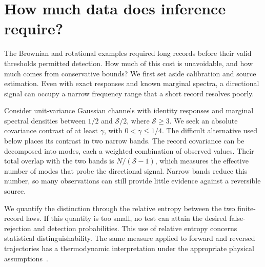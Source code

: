 \section{How much data does inference require?}\label{sec:cost}
The Brownian and rotational examples required long records before their valid thresholds permitted detection. How much of this cost is unavoidable, and how much comes from conservative bounds? We first set aside calibration and source estimation. Even with exact responses and known marginal spectra, a directional signal can occupy a narrow frequency range that a short record resolves poorly.

Consider unit-variance Gaussian channels with identity responses and marginal spectral densities between $1/2$ and $\mathcal S/2$, where $\mathcal S\ge3$. We seek an absolute covariance contrast of at least $\gamma$, with $0<\gamma\le1/4$. The difficult alternative used below places its contrast in two narrow bands. The record covariance can be decomposed into modes, each a weighted combination of observed values. Their total overlap with the two bands is $N/(\mathcal S-1)$, which measures the effective number of modes that probe the directional signal. Narrow bands reduce this number, so many observations can still provide little evidence against a reversible source.

We quantify the distinction through the relative entropy between the two finite-record laws. If this quantity is too small, no test can attain the desired false-rejection and detection probabilities. This use of relative entropy concerns statistical distinguishability. The same measure applied to forward and reversed trajectories has a thermodynamic interpretation under the appropriate physical assumptions~\cite{roldan2010,seifert2012}.

